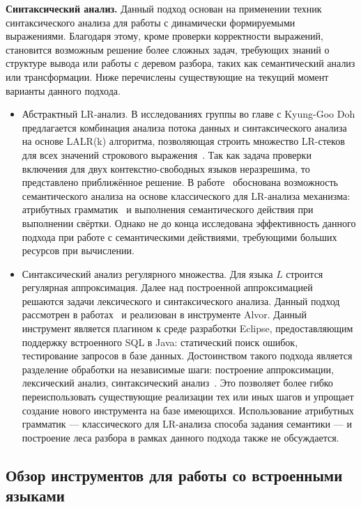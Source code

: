 \textbf{Синтаксический анализ.} Данный подход основан на применении техник синтаксического анализа для работы с динамически формируемыми выражениями. Благодаря этому, кроме проверки корректности выражений, становится возможным решение более сложных задач, требующих знаний о структуре вывода или работы с деревом разбора, таких как семантический анализ или трансформации. Ниже перечислены существующие на текущий момент варианты данного подхода.

\begin{itemize}
    \item Абстрактный LR-анализ. В исследованиях группы во главе  с Kyung-Goo Doh предлагается комбинация анализа потока данных и синтаксического анализа на основе LALR(k) алгоритма, позволяющая строить множество LR-стеков для всех значений строкового выражения~\cite{LrAbstract1, LrAbstract2, LRAbstractParsingSema}. Так как задача проверки включения для двух контекстно-свободных языков неразрешима, то представлено приближённое решение. В работе~\cite{LRAbstractParsingSema} обоснована возможность семантического анализа на основе классического для LR-анализа механизма: атрибутных грамматик~\cite{Dragon} и выполнения семантического действия при выполнении свёртки. Однако не до конца исследована эффективность данного подхода при работе с семантическими действиями, требующими больших ресурсов при вычислении.

    \item Синтаксический анализ регулярного множества. Для языка $L$ строится регулярная аппроксимация. Далее над построенной аппроксимацией решаются задачи лексического и синтаксического анализа. Данный подход рассмотрен в работах~\cite{Alvor1, Alvor2} и реализован в инструменте Alvor. Данный инструмент является плагином к среде разработки Eclipse, предоставляющим поддержку встроенного SQL в Java: статический поиск ошибок, тестирование запросов в базе данных. Достоинством такого подхода является разделение обработки на независимые шаги: построение аппроксимации, лексический анализ, синтаксический анализ~\cite{Alvor2}. Это позволяет более гибко переиспользовать существующие реализации тех или иных шагов и упрощает создание нового инструмента на базе имеющихся. Использование атрибутных грамматик --- классического для LR-анализа способа задания семантики --- и построение леса разбора в рамках данного подхода также не обсуждается.

\end{itemize}


\subsection{Обзор инструментов для работы со встроенными языками}\label{SELToolsDescr}

